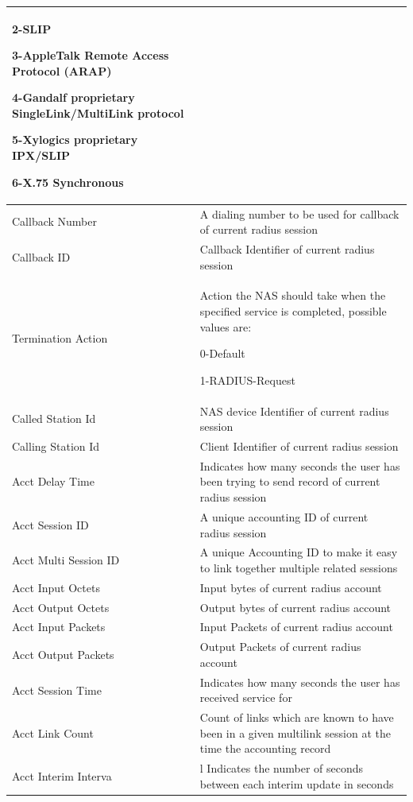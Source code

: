 \begin{longtable}{p{}|p{}}
                        2-SLIP


                        3-AppleTalk Remote Access Protocol (ARAP)


                        4-Gandalf proprietary SingleLink/MultiLink protocol


                        5-Xylogics proprietary IPX/SLIP


                        6-X.75 Synchronous \\\hline                                                                                
    Callback Number &	A dialing number to be used for callback of current radius session \\\hline
    Callback ID &	Callback Identifier of current radius session \\\hline
    Termination Action &	Action the NAS should take when the specified service is completed, possible values are:


                            0-Default


                            1-RADIUS-Request \\\hline
    Called Station Id &	NAS device Identifier of current radius session \\\hline
    Calling Station Id &	Client Identifier of current radius session \\\hline
    Acct Delay Time &	Indicates how many seconds the user has been trying to send record of current radius session \\\hline
    Acct Session ID &	A unique accounting ID of current radius session \\\hline
    Acct Multi Session ID &	A unique Accounting ID to make it easy to link together multiple related sessions \\\hline
    Acct Input Octets &	Input bytes of current radius account \\\hline
    Acct Output Octets &	Output bytes of current radius account \\\hline
    Acct Input Packets &	Input Packets of current radius account \\\hline
    Acct Output Packets &	Output Packets of current radius account \\\hline
    Acct Session Time &	Indicates how many seconds the user has received service for \\\hline
    Acct Link Count &	Count of links which are known to have been in a given multilink session at the time the accounting record \\\hline
    Acct Interim Interva &l	Indicates the number of seconds between each interim update in seconds \\\hline                            
\end{longtable} 

